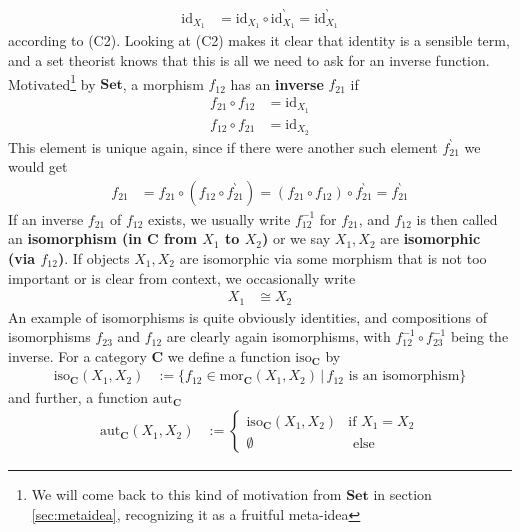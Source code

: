 \begin{align*}
  \mathrm{id}_{X_{1}}
  &=
  \mathrm{id}_{X_{1}}
  \circ
  \mathrm{id}_{X_{1}}^{\backprime}
  =
  \mathrm{id}_{X_{1}}^{\backprime}
\end{align*}
according to (C2).
Looking at (C2) makes it clear that identity is a sensible term, and a set theorist knows that this is all we need to ask for an inverse function.
Motivated\footnote{We will come back to this kind of motivation from $\mathbf{Set}$ in section \ref{sec:metaidea}, recognizing it as a fruitful meta-idea} by $\mathbf{Set}$, a morphism $f_{12}$ has an \textbf{inverse} $f_{21}$ if
\begin{align*}
  f_{21}
  \circ
  f_{12}
  &=
  \mathrm{id}_{X_{1}}
  \\
  f_{12}
  \circ
  f_{21}
  &=
  \mathrm{id}_{X_{2}}
\end{align*}
This element is unique again, since if there were another such element $f_{21}^{\backprime}$ we would get
\begin{align*}
  f_{21}
  &=
  f_{21}
  \circ
  \left(
    f_{12}
    \circ
    f_{21}^{\backprime}
  \right)
  =
  (f_{21} \circ f_{12})
  \circ
  f_{21}^{\backprime}
  =
  f_{21}^{\backprime}
\end{align*}
If an inverse $f_{21}$ of $f_{12}$ exists, we usually write $f_{12}^{-1}$ for $f_{21}$, and $f_{12}$ is then called an \textbf{isomorphism (in $\mathbf{C}$ from $X_{1}$ to $X_{2}$)} or we say $X_{1},X_{2}$ are \textbf{isomorphic (via $f_{12}$)}.
If objects $X_{1},X_{2}$ are isomorphic via some morphism that is not too important or is clear from context, we occasionally write
\begin{align*}
  X_{1}
  &\cong
  X_{2}
\end{align*}
An example of isomorphisms is quite obviously identities, and compositions of isomorphisms $f_{23}$ and $f_{12}$ are clearly again isomorphisms, with $f_{12}^{-1} \circ f_{23}^{-1}$ being the inverse.
For a category $\mathbf{C}$ we define a function $\mathrm{iso}_{\mathbf{C}}$ by
\begin{align*}
  \mathrm{iso}_{\mathbf{C}}(X_{1},X_{2})
  &:=
  \lbrace
      f_{12}
      \in
      \mathrm{mor}_{\mathbf{C}}(X_{1},X_{2})
    \,
    \vert
    \,
      f_{12}
      \text{ is an isomorphism}
  \rbrace
\end{align*}
and further, a function $\mathrm{aut}_{\mathbf{C}}$
\begin{align*}
  \mathrm{aut}_{\mathbf{C}}(X_{1},X_{2})
  &:=
  \begin{cases}
    \mathrm{iso}_{\mathbf{C}}(X_{1},X_{2})
    &
    \text{if }
    X_{1}
    =
    X_{2}
    \\
    \emptyset
    &
    \text{ else}
  \end{cases}
\end{align*}
